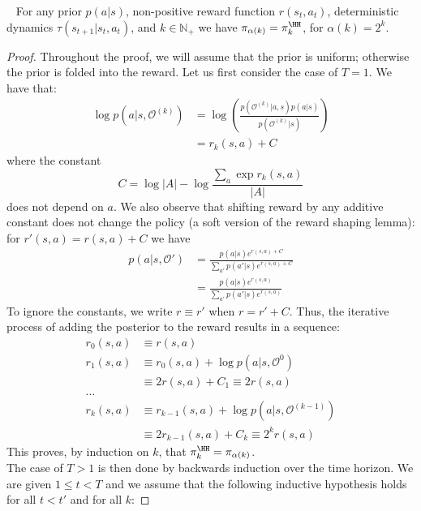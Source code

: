 \begin{lemma}~\label{lemma:equivalence-temperature-folding}
    For any prior $p(a|s)$, non-positive reward function $r(s_t,a_t)$, deterministic dynamics $\tau(s_{t+1}|s_t, a_t)$, and $k \in \mathbb{N}_+$ we have $\pi_{\alpha(k)} = \pi^\HH_k$, for $\alpha(k) = 2^k$.
\end{lemma}
\begin{proof}
    Throughout the proof, we will assume that the prior is uniform; otherwise the prior is folded into the reward. Let us first consider the case of $T = 1$. We have that:
    \begin{align*}
        \log p(a|s, \mathcal{O}^{(k)}) &= \log\left(\frac{p(\mathcal{O}^{(k)}|a, s)p(a|s)}{p(\mathcal{O}^{(k)}|s)}\right) \\
        &= r_k(s, a) + C
    \end{align*}
    where the constant
    \[
    C = \log |A| - \log \frac{\sum_{a}\exp r_k(s, a)}{|A|}
    \]
    does not depend on $a$. We also observe that shifting reward by any additive constant does not change the policy (a soft version of the reward shaping lemma): for $r'(s, a) = r(s,a) + C$ we have
    \begin{align*}
        p(a|s, \mathcal{O}') &= \frac{p(a|s) e^{r(s, a) + C}}{\sum_{a'} p(a'|s)e^{r(s,a) + C}} \\
        &= \frac{p(a|s) e^{r(s, a)}}{\sum_{a'} p(a'|s)e^{r(s,a)}}
    \end{align*}
    To ignore the constants, we write $r \equiv r'$ when $r = r' + C$. Thus, the iterative process of adding the posterior to the reward results in a sequence:
    \begin{align*}
    r_0(s, a) &\equiv r(s, a) \\
    r_1(s, a) &\equiv r_0(s, a) + \log p(a|s, \mathcal{O}^{0}) \\
    &\equiv 2r(s, a) + C_1 \equiv 2r(s,a) \\
    \dots\\
    r_{k}(s, a) &\equiv r_{k-1}(s, a) + \log p(a|s, \mathcal{O}^{(k-1)}) \\
    &\equiv 2r_{k-1}(s, a) + C_k \equiv 2^{k}r(s,a)
    \end{align*}
    This proves, by induction on $k$, that $\pi^\HH_k = \pi_{\alpha(k)}$.\\
    The case of $T > 1$ is then done by backwards induction over the time horizon. We are given $1 \leq t < T$ and we assume that the following inductive hypothesis holds for all $t < t'$ and for all $k$:

\end{proof}
